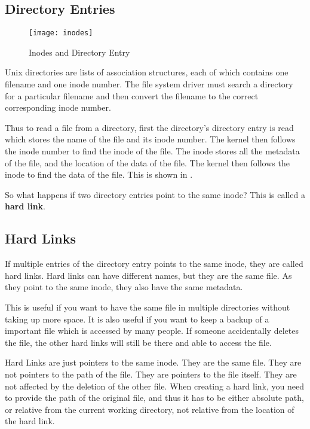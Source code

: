 \subsection{Directory Entries}

\begin{figure*}[ht]
  \texttt{[image: inodes]}
  \caption[Inode and Directory Entry]{Inodes and Directory Entry}
\end{figure*}

Unix directories are lists of association structures, each of which contains one filename and one inode number.
The file system driver must search a directory for a particular filename and then convert the filename to the correct corresponding inode number.

Thus to read a file from a directory, first the directory's directory entry is read which stores the name of the file and its inode number.
The kernel then follows the inode number to find the inode of the file.
The inode stores all the metadata of the file, and the location of the data of the file.
The kernel then follows the inode to find the data of the file.
This is shown in .

So what happens if two directory entries point to the same inode?
This is called a \textbf{hard link}.

\subsection{Hard Links}

If multiple entries of the directory entry points to the same inode, they are called hard links.
Hard links can have different names, but they are the same file.
As they point to the same inode, they also have the same metadata.

This is useful if you want to have the same file in multiple directories without taking up more space.
It is also useful if you want to keep a backup of a important file which is accessed by many people.
If someone accidentally deletes the file, the other hard links will still be there and able to access the file.

\begin{definition}
  Hard Links are just pointers to the same inode. They are the same file.
  They are not pointers to the path of the file. They are pointers to the
  file itself. They are not affected by the deletion of the other file.
  When creating a hard link, you need to provide the path of the original
  file, and thus it has to be either absolute path, or relative from the
  current working directory, not relative from the location of the hard link.
\end{definition}


